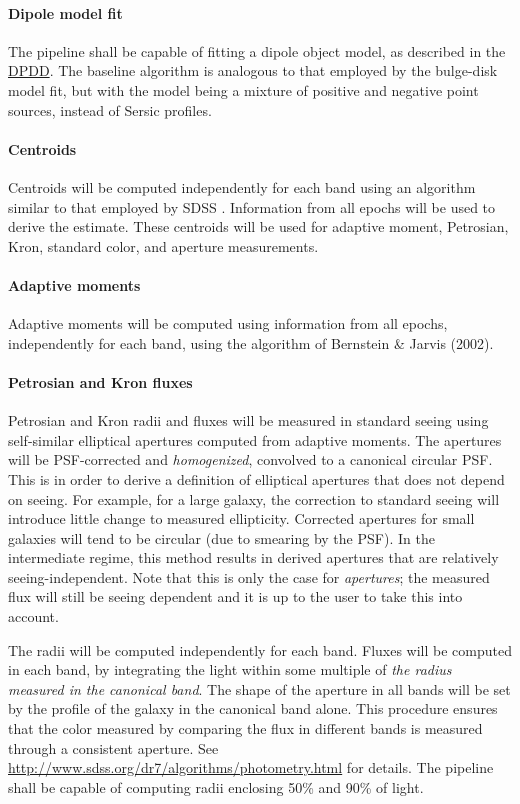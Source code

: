 \documentclass[12pt]{article}
\newcommand{\ds}[2]{{\color{blue} \href{https://docushare.lsstcorp.org/docushare/dsweb/Get/#1}{#2}}\xspace}
\newcommand{\DPDD}{\ds{LSE-163}{DPDD}}
\begin{document}
\paragraph{Dipole model fit}

The pipeline shall be capable of fitting a dipole object model, as described in the \DPDD. The baseline algorithm is analogous to that employed by the bulge-disk model fit, but with the model being a mixture of positive and negative point sources, instead of Sersic profiles.

\paragraph{Centroids} Centroids will be computed independently for each band using an algorithm similar to that employed by SDSS \cite{LuptonPhoto}. Information from all epochs will be used to derive the estimate. These centroids will be used for adaptive moment, Petrosian, Kron, standard color, and aperture measurements.

\paragraph{Adaptive moments} Adaptive moments will be computed using information from all epochs, independently for each band, using the algorithm of Bernstein \& Jarvis (2002).

\paragraph{Petrosian and Kron fluxes} Petrosian and Kron radii and fluxes will be measured in standard seeing using self-similar elliptical apertures computed from adaptive moments. The apertures will be PSF-corrected and {\em homogenized}, convolved to a canonical circular PSF. This is in order to derive a definition of elliptical apertures that does not depend on seeing. For example, for a large galaxy, the correction to standard seeing will introduce little change to measured ellipticity. Corrected apertures for small galaxies will tend to be circular (due to smearing by the PSF). In the intermediate regime, this method results in derived apertures that are relatively seeing-independent. Note that this is only the case for {\em apertures}; the measured flux will still be seeing dependent and it is up to the user to take this into account.

The radii will be computed independently for each band. Fluxes will be computed in each band, by integrating the light within some multiple of {\em the radius measured in the canonical band}. The shape of the aperture in all bands will be set by the profile of the galaxy in the canonical band alone. This procedure ensures that the color measured by comparing the flux in different bands is measured through a consistent aperture. See \url{http://www.sdss.org/dr7/algorithms/photometry.html} for details. The pipeline shall be capable of computing radii enclosing 50\% and 90\% of light.
\end{document}
